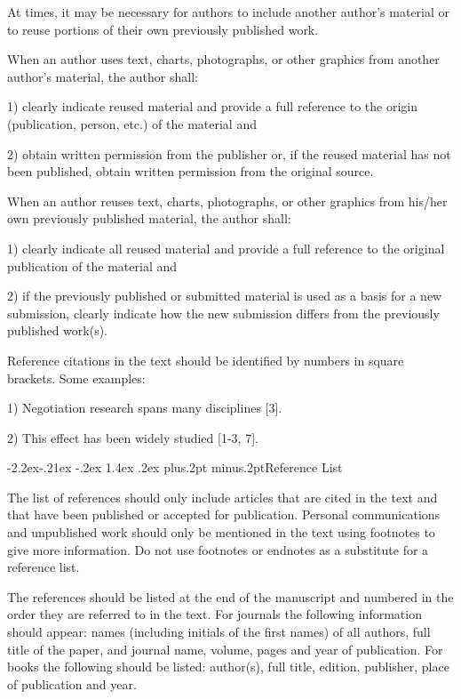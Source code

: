 \documentclass[twoside]{article}
\makeatletter
\def\subsubsection{\@startsection{subsubsection}{3}{\z@}%
 {-2.2ex\@plus -.21ex \@minus -.2ex}%
 {1.4ex \@plus.2ex}
{\normalfont\normalsize\protect\baselineskip=12pt plus.2pt minus.2pt\sl}}
\makeatother
\begin{document}
\begin{multicols}{2}
At times, it may be necessary for authors to include another author's material or to reuse portions of their own previously published work.

When an author uses text, charts, photographs, or other graphics from another author's material, the author shall:

1) clearly indicate reused material and provide a full reference to the origin (publication, person, etc.) of the material and

2) obtain written permission from the publisher or, if the reused material has not been published, obtain written permission from the original source.

When an author reuses text, charts, photographs, or other graphics from his/her own previously published material, the author shall:

1) clearly indicate all reused material and provide a full reference to the original publication of the material and

2) if the previously published or submitted material is used as a basis for a new submission, clearly indicate how the new submission differs from the previously published work(s).

Reference citations in the text should be identified by numbers in square
brackets. Some examples:

1) Negotiation research spans many disciplines [3].

2) This effect has been widely studied [1-3, 7].

\subsubsection{Reference List}

The list of references should only include articles that are cited in the text and that have been published or accepted for publication. Personal communications and unpublished work should only be mentioned in the text using footnotes to give more information. Do not use footnotes or endnotes as a substitute for a reference list.

The references should be listed at the end of the manuscript and numbered in the order they are referred to in the text. For journals the following information should appear: names (including initials of the first names) of all authors, full title of the paper, and journal name, volume, pages and year of publication. For books the following should be listed: author(s), full title, edition, publisher, place of publication and year.


\end{multicols}
\end{document}
